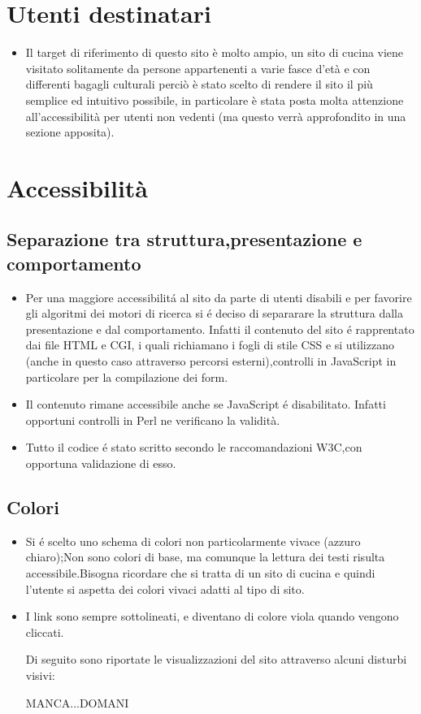 \documentclass[12pt]{article}
\begin{document}
		\section{Utenti destinatari}
		\begin{itemize}
			\item Il target di riferimento di questo sito è molto ampio, un sito di cucina viene visitato solitamente da persone appartenenti a varie fasce d'età e con differenti bagagli culturali perciò è stato scelto di rendere il sito il più semplice ed intuitivo possibile, in particolare è stata posta molta attenzione all'accessibilità per utenti non vedenti (ma questo verrà approfondito in una sezione apposita). 

		\end{itemize}
		\section{Accessibilit\`a}
		\subsection{Separazione tra struttura,presentazione e comportamento}
		\begin{itemize}
			\item Per una maggiore accessibilit\'a al sito da parte di utenti disabili e per favorire gli algoritmi dei motori di ricerca si \'e deciso di separarare la struttura dalla presentazione e dal comportamento.
			Infatti il contenuto del sito \'e rapprentato dai file HTML e CGI, i quali richiamano i fogli di stile CSS e si utilizzano (anche in questo caso attraverso percorsi esterni),controlli in JavaScript in particolare per la compilazione dei form. 

			\item Il contenuto rimane accessibile anche se JavaScript \'e disabilitato. Infatti opportuni controlli in Perl ne verificano la validit\`a.

			\item Tutto il codice \'e stato scritto secondo le raccomandazioni W3C,con opportuna validazione di esso.
		\end{itemize}
			\subsection{Colori}
			\begin{itemize}
				\item Si \'e scelto uno schema di colori non particolarmente vivace (azzuro chiaro);Non sono colori di base, ma comunque la lettura dei testi risulta accessibile.Bisogna ricordare che si tratta di un sito di cucina e quindi l'utente si aspetta dei colori vivaci adatti al tipo di sito. 

				\item I link sono sempre sottolineati, e diventano di colore viola quando vengono cliccati.

				Di seguito sono riportate le visualizzazioni del sito attraverso alcuni disturbi visivi:

				MANCA...DOMANI
			\end{itemize}	
			
\end{document}
